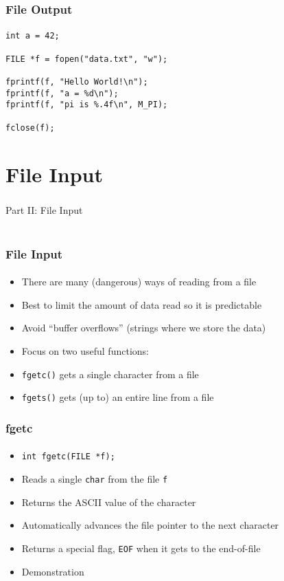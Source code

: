 \documentclass[]{beamer}
\begin{document}
\begin{frame}[fragile]
  \frametitle{File Output}
  \framesubtitle{}

\begin{verbatim}
int a = 42;

FILE *f = fopen("data.txt", "w");

fprintf(f, "Hello World!\n");
fprintf(f, "a = %d\n");
fprintf(f, "pi is %.4f\n", M_PI);

fclose(f);
\end{verbatim}

\end{frame}


\section{File Input}

\begin{frame}
  \frametitle{}
  \framesubtitle{}
    
    \begin{center}
    {\Huge Part II: File Input}\\
    {\Large ~}
    \end{center}

\end{frame}

\begin{frame}[fragile]
  \frametitle{File Input}
  \framesubtitle{}

\begin{itemize}[<+->]
  \item There are many (dangerous) ways of reading from a file
  \item Best to limit the amount of data read so it is predictable
  \item Avoid ``buffer overflows'' (strings where we store the data)
  \item Focus on two useful functions:
  \item \texttt{fgetc()} gets a single character from a file
  \item \texttt{fgets()} gets (up to) an entire line from a file 
\end{itemize}  
  
\end{frame}

\begin{frame}[fragile]
  \frametitle{fgetc}
  \framesubtitle{}

\begin{itemize}[<+->]
  \item \texttt{int fgetc(FILE *f);}
  \item Reads a single \texttt{char} from the file \texttt{f}
  \item Returns the ASCII value of the character
  \item Automatically advances the file pointer to the next character
  \item Returns a special flag, \texttt{EOF} when it gets to the end-of-file
  \item Demonstration
\end{itemize}
  
\end{frame}
\end{document}
